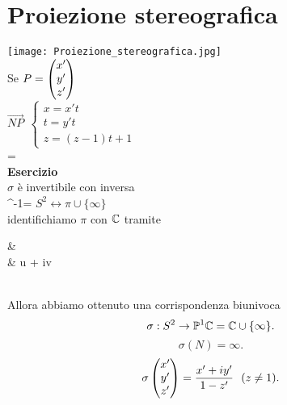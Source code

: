 \documentclass[12px]{article}
\begin{document}
	\section{Proiezione stereografica}
	\texttt{[image: Proiezione\_stereografica.jpg]}\\
	Se $P = \begin{pmatrix}x'\\y'\\z'\end{pmatrix}$\\
	 $\overrightarrow{NP}\ \ \begin{cases}
	 	x = x't\\
		t = y't\\
		z = (z-1)t + 1
	 \end{cases}$\\
	 \sigma {} = \\
	 \textbf{Esercizio}\\
	 $\sigma$ è invertibile con inversa\\
	 \sigma^-1=
	 $S^2 \leftrightarrow \pi\cup \{\infty\}$\\
	 identifichiamo  $\pi$ con $\mathbb{C}$ tramite\\
	 \begin{aligend}
		&\pi \ \ \ \ \rightarrow\ \ \ \ \ \C\\
		& \rightarrow u + iv
	 \end{aligend}\\
	 Allora abbiamo ottenuto una corrispondenza biunivoca 
	 \[
		 \sigma : S^2 \rightarrow \mathbb{P}^1{\mathbb{C}} = \mathbb{C}\cup\{\infty\}
	 .\] 
	 \[
	 \sigma(N) =\infty
	 .\] 
	 \[
	 \sigma\begin{pmatrix}x'\\y'\\z'\end{pmatrix} = \frac{x'+iy' }{1-z'} \ \ (z\neq 1)
	 .\] 
\end{document}
